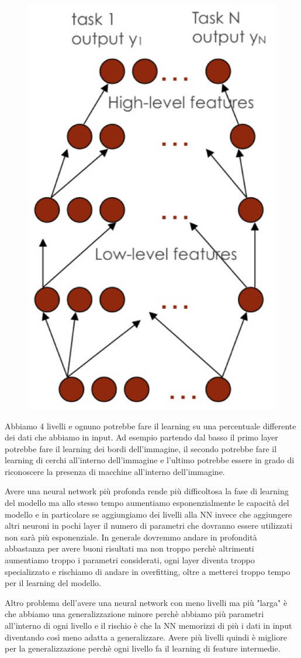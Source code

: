 \documentclass[14pt]{extreport}
\begin{document}
\begin{figure}[H]
	\centering
	\includegraphics[width=0.5\linewidth]{372.jpeg}
\end{figure}

Abbiamo 4 livelli e ognuno potrebbe fare il learning su una percentuale differente dei dati che abbiamo in input. Ad esempio partendo dal basso il
primo layer potrebbe fare il learning dei bordi dell'immagine, il secondo potrebbe fare il learning di cerchi all'interno dell'immagine e l'ultimo
potrebbe essere in grado di riconoscere la presenza di macchine all'interno dell'immagine.

Avere una neural network più profonda rende più difficoltosa la fase di learning del modello ma allo stesso tempo aumentiamo esponenzialmente le
capacità del modello e in particolare se aggiungiamo dei livelli alla NN invece che aggiungere altri neuroni in pochi layer il numero di parametri che
dovranno essere utilizzati non sarà più esponenziale. In generale dovremmo andare in profondità abbastanza per avere buoni risultati ma non troppo
perchè altrimenti aumentiamo troppo i parametri considerati, ogni layer diventa troppo specializzato e rischiamo di andare in overfitting, oltre a
metterci troppo tempo per il learning del modello.

Altro problema dell'avere una neural network con meno livelli ma più "larga" è che abbiamo una generalizzazione minore perchè abbiamo più parametri
all'interno di ogni livello e il rischio è che la NN memorizzi di più i dati in input diventando così meno adatta a generalizzare. Avere più livelli
quindi è migliore per la generalizzazione perchè ogni livello fa il learning di feature intermedie.
\end{document}
